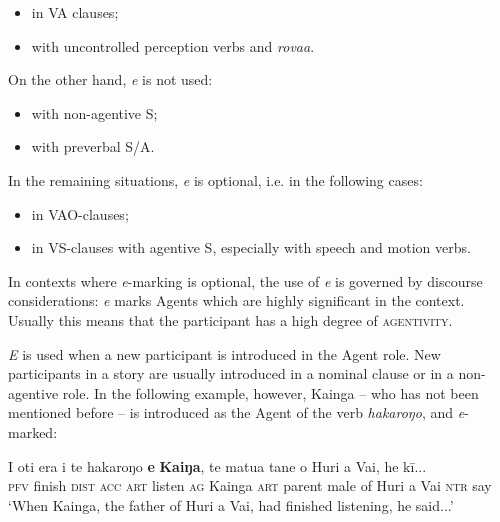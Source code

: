 {\begin{itemize}
\item 
in VA clauses;

\item 
with uncontrolled perception verbs and \textit{rova{\ꞌ}a}.

\end{itemize}

On the other hand, \textit{e} is not used:

\begin{itemize}
\item 
with non-agentive S;

\item 
with preverbal S/A.

\end{itemize}

In the remaining situations, \textit{e} is optional, i.e. in the following cases:

\begin{itemize}
\item 
in VAO-clauses;

\item 
in VS-clauses with agentive S, especially with speech and motion verbs.

\end{itemize}

In contexts where \textit{e}{}-marking is optional, the use of \textit{e} is governed by discourse considerations: \textit{e} marks Agents which are highly significant in the context. Usually this means that the participant has a high degree of \textsc{agentivity}. 

\textit{E} is used when a new participant is introduced in the Agent role. New participants in a story are usually introduced in a nominal clause or in a non-agentive role. In the following example, however, Kainga – who has not been mentioned before – is introduced as the Agent of the verb \textit{hakaroŋo}, and \textit{e}\nobreakdash-marked:

\ea\label{ex:8.19}
\gll I oti era i te hakaroŋo \textbf{e} \textbf{Kaiŋa}, te matu{\ꞌ}a tane o Huri {\ꞌ}a Vai, he kī...\\
\textsc{pfv} finish \textsc{dist} \textsc{acc} \textsc{art} listen \textsc{ag} Kainga \textsc{art} parent male of Huri a Vai \textsc{ntr} say\\

\glt
‘When Kainga, the father of Huri a Vai, had finished listening, he said...’ \textstyleExampleref{[R304.011]} 
\z

}
